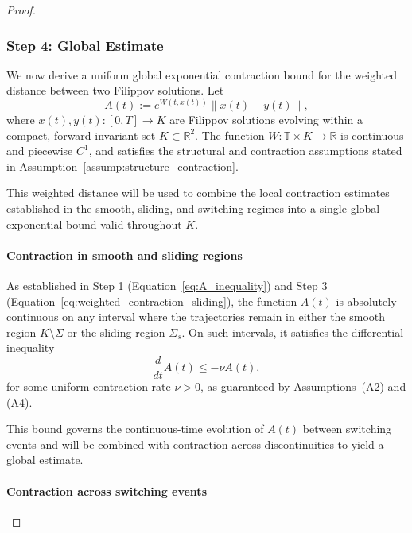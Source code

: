 \documentclass[11pt]{article}
\begin{document}
\begin{proof}
\subsubsection*{Step 4: Global Estimate}

We now derive a uniform global exponential contraction bound for the weighted distance between two Filippov solutions. Let
\begin{equation} \label{eq:step4_weighted_distance}
	A(t) := e^{W(t, x(t))} \|x(t) - y(t)\|,
\end{equation}
where \( x(t), y(t) : [0,T] \to K \) are Filippov solutions evolving within a compact, forward-invariant set \( K \subset \mathbb{R}^2 \). The function \( W : \mathbb{T} \times K \to \mathbb{R} \) is continuous and piecewise \( C^1 \), and satisfies the structural and contraction assumptions stated in Assumption~\ref{assump:structure_contraction}.

This weighted distance will be used to combine the local contraction estimates established in the smooth, sliding, and switching regimes into a single global exponential bound valid throughout \( K \).

\paragraph{Contraction in smooth and sliding regions}

As established in Step 1 (Equation~\eqref{eq:A_inequality}) and Step 3 (Equation~\eqref{eq:weighted_contraction_sliding}), the function \( A(t) \) is absolutely continuous on any interval where the trajectories remain in either the smooth region \( K \setminus \Sigma \) or the sliding region \( \Sigma_s \). On such intervals, it satisfies the differential inequality
\begin{equation} \label{eq:step4_differential_inequality}
	\frac{d}{dt} A(t) \leq -\nu A(t),
\end{equation}
for some uniform contraction rate \( \nu > 0 \), as guaranteed by Assumptions~(A2) and (A4).

This bound governs the continuous-time evolution of \( A(t) \) between switching events and will be combined with contraction across discontinuities to yield a global estimate.

\paragraph{Contraction across switching events}


\end{proof}
\end{document}
